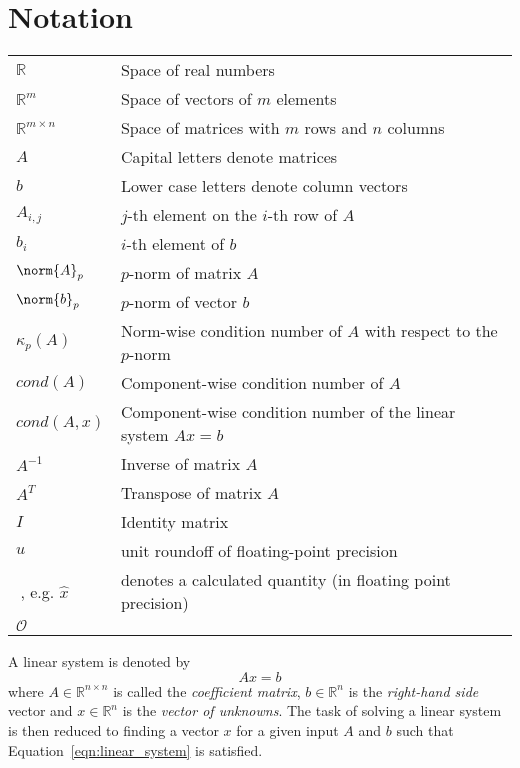 \section{Notation}
\label{sec:notation}


\begin{tabular}{ll}
  $\mathbb{R}$ & Space of real numbers \\
  $\mathbb{R}^{m}$ & Space of vectors of $m$ elements \\
  $\mathbb{R}^{m \times n}$ & Space of matrices with $m$ rows and $n$ columns \\
  $A$ & Capital letters denote matrices \\
  $b$ & Lower case letters denote column vectors \\
  $A_{i,j}$ & $j$-th element on the $i$-th row of $A$ \\
  $b_{i}$ & $i$-th element of $b$ \\
  $\norm{A}_p$ & $p$-norm of matrix $A$ \\
  $\norm{b}_p$ & $p$-norm of vector $b$ \\
  $\kappa_{p}(A)$ & Norm-wise condition number of $A$ with respect to the $p$-norm \\
  $cond(A)$ & Component-wise condition number of $A$ \\
  $cond(A, x)$ & Component-wise condition number of the linear system $Ax=b$ \\
  $A^{-1}$ & Inverse of matrix $A$ \\
  $A^T$    & Transpose of matrix $A$ \\
  $I$      & Identity matrix  \\
  $u$      & unit roundoff of floating-point precision \\
  $\hat{}\;$, e.g. $\hat{x}$ & denotes a calculated quantity (in floating point precision) \\
  $\mathcal{O}$ &
\end{tabular}
\vspace{0.5cm}

\noindent A linear system is denoted by
\begin{equation}
\label{eqn:linear_system}
    Ax=b
\end{equation}
\noindent where $A \in \mathbb{R}^{n \times n}$ is called the \textit{coefficient matrix}, $b \in \mathbb{R}^{n}$ is the \textit{right-hand side} vector and $x \in \mathbb{R}^{n}$ is the \textit{vector of unknowns}. The task of solving a linear system is then reduced to finding a vector $x$ for a given input $A$ and $b$ such that Equation~\hyperref[eqn:linear_system]{\ref{eqn:linear_system}} is satisfied.

